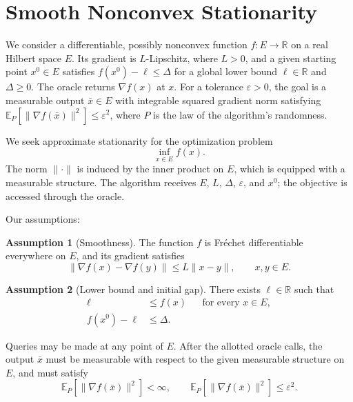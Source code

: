 \documentclass[10pt]{article}
\theoremstyle{definition}
\newtheorem{assumption}{Assumption}
\begin{document}
\section*{Smooth Nonconvex Stationarity}
We consider a differentiable, possibly nonconvex function $f:E\to\mathbb{R}$ on a real Hilbert space $E$. Its gradient is $L$-Lipschitz, where $L>0$, and a given starting point $x^0\in E$ satisfies $f(x^0)-\ell\leq\Delta$ for a global lower bound $\ell\in\mathbb{R}$ and $\Delta\geq0$. The oracle returns $\nabla f(x)$ at $x$. For a tolerance $\varepsilon>0$, the goal is a measurable output $\bar{x}\in E$ with integrable squared gradient norm satisfying $\mathbb{E}_{P}[\|\nabla f(\bar{x})\|^2]\leq\varepsilon^2$, where $P$ is the law of the algorithm's randomness.

We seek approximate stationarity for the optimization problem
\[
\inf_{x\in E} f(x).
\]
The norm $\|\cdot\|$ is induced by the inner product on $E$, which is equipped with a measurable structure. The algorithm receives $E$, $L$, $\Delta$, $\varepsilon$, and $x^0$; the objective is accessed through the oracle.

Our assumptions:
\begin{assumption}[Smoothness]
The function $f$ is Fr\'echet differentiable everywhere on $E$, and its gradient satisfies
\[
\|\nabla f(x)-\nabla f(y)\|\leq L\|x-y\|,
\qquad x,y\in E.
\]
\end{assumption}

\begin{assumption}[Lower bound and initial gap]
There exists $\ell\in\mathbb{R}$ such that
\[
\begin{aligned}
\ell&\leq f(x) &&\text{for every }x\in E,\\
f(x^0)-\ell&\leq\Delta.
\end{aligned}
\]
\end{assumption}

Queries may be made at any point of $E$. After the allotted oracle calls, the output $\bar{x}$ must be measurable with respect to the given measurable structure on $E$, and must satisfy
\[
\mathbb{E}_{P}\!\left[\|\nabla f(\bar{x})\|^2\right]<\infty,
\qquad
\mathbb{E}_{P}\!\left[\|\nabla f(\bar{x})\|^2\right]\leq\varepsilon^2.
\]
\end{document}
